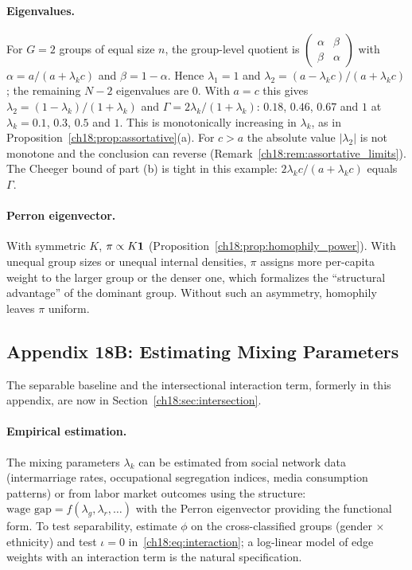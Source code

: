 \documentclass[../structural_economics_book.tex]{subfiles}
\begin{document}
\paragraph{Eigenvalues.} For $G = 2$ groups of equal size $n$, the group-level quotient is $\begin{pmatrix}\alpha&\beta\\\beta&\alpha\end{pmatrix}$ with $\alpha = a/(a+\lambda_k c)$ and $\beta = 1-\alpha$. Hence $\lambda_1 = 1$ and $\lambda_2 = (a - \lambda_k c)/(a + \lambda_k c)$; the remaining $N-2$ eigenvalues are $0$. With $a = c$ this gives $\lambda_2 = (1-\lambda_k)/(1+\lambda_k)$ and $\Gamma = 2\lambda_k/(1+\lambda_k)$: $0.18$, $0.46$, $0.67$ and $1$ at $\lambda_k = 0.1$, $0.3$, $0.5$ and $1$. This is monotonically increasing in $\lambda_k$, as in Proposition~\ref{ch18:prop:assortative}(a). For $c > a$ the absolute value $|\lambda_2|$ is not monotone and the conclusion can reverse (Remark~\ref{ch18:rem:assortative_limits}). The Cheeger bound of part (b) is tight in this example: $2\lambda_k c/(a + \lambda_k c)$ equals $\Gamma$.

\paragraph{Perron eigenvector.} With symmetric $K$, $\pi \propto K\mathbf{1}$ (Proposition~\ref{ch18:prop:homophily_power}). With unequal group sizes or unequal internal densities, $\pi$ assigns more per-capita weight to the larger group or the denser one, which formalizes the ``structural advantage'' of the dominant group. Without such an asymmetry, homophily leaves $\pi$ uniform.

\subsection*{Appendix 18B: Estimating Mixing Parameters}
\label{ch18:app:intersectionality}

The separable baseline and the intersectional interaction term, formerly in this appendix, are now in Section~\ref{ch18:sec:intersection}.

\paragraph{Empirical estimation.} The mixing parameters $\lambda_k$ can be estimated from social network data (intermarriage rates, occupational segregation indices, media consumption patterns) or from labor market outcomes using the structure: $\text{wage gap} = f(\lambda_g, \lambda_r, \ldots)$ with the Perron eigenvector providing the functional form. To test separability, estimate $\phi$ on the cross-classified groups (gender $\times$ ethnicity) and test $\iota = 0$ in~\eqref{ch18:eq:interaction}; a log-linear model of edge weights with an interaction term is the natural specification.
\end{document}
